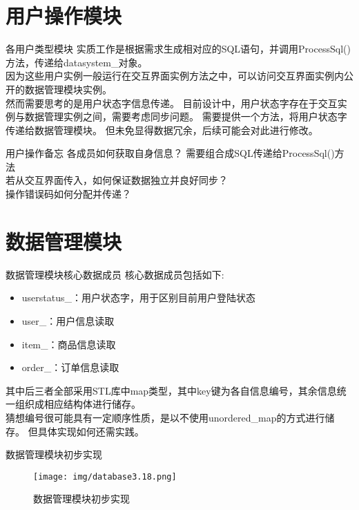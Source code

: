 \documentclass[10pt]{beamer}
\begin{document}
\section{用户操作模块}

\begin{frame}{各用户类型模块}
    实质工作是根据需求生成相对应的SQL语句，并调用ProcessSql()方法，传递给datasystem\_对象。\\
    因为这些用户实例一般运行在交互界面实例方法之中，可以访问交互界面实例内公开的数据管理模块实例。\\
    然而需要思考的是用户状态字信息传递。
    目前设计中，用户状态字存在于交互实例与数据管理实例之间，需要考虑同步问题。
    需要提供一个方法，将用户状态字传递给数据管理模块。
    但未免显得数据冗余，后续可能会对此进行修改。\\
\end{frame}

\begin{frame}{用户操作备忘}
    各成员如何获取自身信息？
    需要组合成SQL传递给ProcessSql()方法\\
    若从交互界面传入，如何保证数据独立并良好同步？\\
    操作错误码如何分配并传递？\\
\end{frame}

\section{数据管理模块}

\begin{frame}{数据管理模块核心数据成员}
    核心数据成员包括如下:\\
    \begin{itemize}
        \item userstatus\_：用户状态字，用于区别目前用户登陆状态
        \item user\_：用户信息读取
        \item item\_：商品信息读取
        \item order\_：订单信息读取
    \end{itemize}
    其中后三者全部采用STL库中map类型，其中key键为各自信息编号，其余信息统一组织成相应结构体进行储存。\\
    猜想编号很可能具有一定顺序性质，是以不使用unordered\_map的方式进行储存。
    但具体实现如何还需实践。\\
\end{frame}

\begin{frame}{数据管理模块初步实现}
    \begin{figure}[H]
        \centering
        \texttt{[image: img/database3.18.png]}
        \caption{数据管理模块初步实现}
        \label{database3.18}
    \end{figure}
\end{frame}
\end{document}
